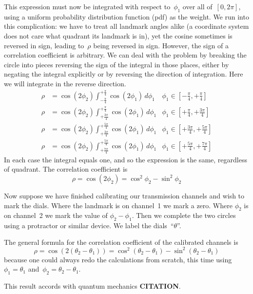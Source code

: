 \documentclass[9pt,technote]{IEEEtran}
\begin{document}
This expression must now be integrated with respect to~$\phi_1$ over
all of~$[0,2\pi]$, using a uniform probability distribution function
(pdf) as the weight. We run into this complication: we have to treat
all landmark angles alike (a coordinate system does not care what
quadrant its landmark is in), yet the cosine sometimes is reversed in
sign, leading to~$\rho$ being reversed in sign. However, the sign of a
correlation coefficient is arbitrary. We can deal with the problem by
breaking the circle into pieces reversing the sign of the integral in
those places, either by negating the integral explicitly or by
reversing the direction of integration. Here we will integrate in the
reverse direction.
\begin{align}
\rho &= \cos(2\phi_2)\int_{-\frac{\pi}{4}}^{+\frac{\pi}{4}}\cos(2\phi_1)\,d\phi_1&\phi_1\in[-\frac{\pi}{4},+\frac{\pi}{4}] \\
\rho &= \cos(2\phi_2)\int_{+\frac{3\pi}{4}}^{+\frac{\pi}{4}}\cos(2\phi_1)\,d\phi_1&\phi_1\in[+\frac{\pi}{4},+\frac{3\pi}{4}] \\
\rho &= \cos(2\phi_2)\int_{+\frac{3\pi}{4}}^{+\frac{5\pi}{4}}\cos(2\phi_1)\,d\phi_1&\phi_1\in[+\frac{3\pi}{4},+\frac{5\pi}{4}] \\
\rho &= \cos(2\phi_2)\int_{+\frac{7\pi}{4}}^{+\frac{5\pi}{4}}\cos(2\phi_1)\,d\phi_1&\phi_1\in[+\frac{5\pi}{4},+\frac{7\pi}{4}]
\end{align}
In each case the integral equals one, and so the expression is the
same, regardless of quadrant. The correlation coefficient is
\begin{equation}
  \rho = \cos(2\phi_2) = \cos^2\phi_2 - \sin^2\phi_2
\end{equation}

Now suppose we have finished calibrating our transmission channels and
wish to mark the dials. Where the landmark is on channel~1 we mark a
zero. Where $\phi_2$ is on channel~2 we mark the value of
$\phi_2-\phi_1$. Then we complete the two circles using a protractor
or similar device. We label the dials~``$\theta$''.

The general formula for the correlation coefficient of the calibrated
channels is
\begin{equation}
  \rho = \cos(2(\theta_2-\theta_1)) = \cos^2(\theta_2-\theta_1) - \sin^2(\theta_2-\theta_1)
\end{equation}
because one could always redo the calculations from scratch, this time
using $\phi_1=\theta_1$ and~$\phi_2=\theta_2-\theta_1$.

This result accords with quantum mechanics {\bf{CITATION}}.
\end{document}
